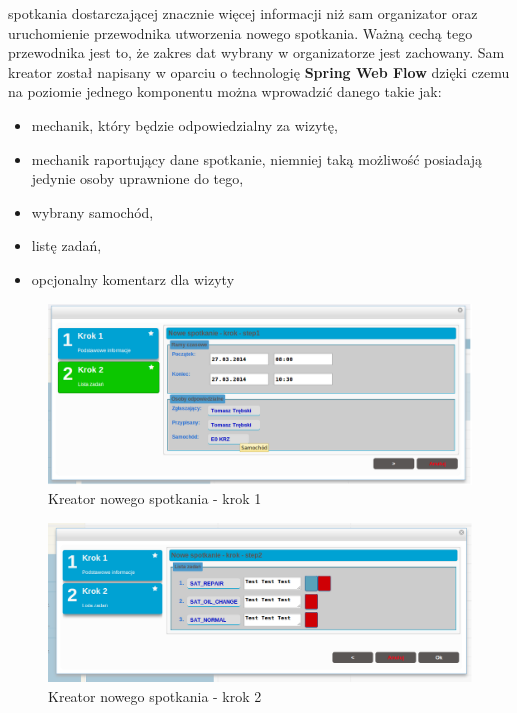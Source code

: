 		spotkania dostarczającej znacznie więcej informacji niż sam organizator oraz uruchomienie
		przewodnika utworzenia nowego spotkania. Ważną cechą tego przewodnika jest to, że 
		zakres dat wybrany w organizatorze jest zachowany.
		Sam kreator został napisany w oparciu o technologię \textbf{Spring Web Flow} dzięki czemu
		na poziomie jednego komponentu można wprowadzić danego takie jak: 
		\begin{itemize}
			\item mechanik, który będzie odpowiedzialny za wizytę,
			\item mechanik raportujący dane spotkanie, niemniej taką możliwość posiadają jedynie osoby uprawnione do tego,
			\item wybrany samochód,
			\item listę zadań,
			\item opcjonalny komentarz dla wizyty
		\end{itemize}
		\begin{figure}[H]
			\centering
			\includegraphics[width=1.0\textwidth]{images/newAppointment_step1}
			\caption[Kreator nowego spotkania - krok 1]{
				Kreator nowego spotkania - krok 1
			}
			\label{app:wizard_newAppointment_step1}
		\end{figure}
		\begin{figure}[H]
			\centering
			\includegraphics[width=1.0\textwidth]{images/newAppointment_step2}
			\caption[Kreator nowego spotkania - krok 2]{
				Kreator nowego spotkania - krok 2
			}
			\label{app:wizard_newAppointment_step2}
		\end{figure}
